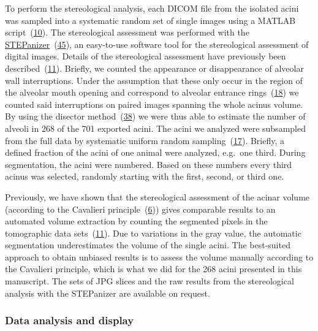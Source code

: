 \documentclass[
  american,
]{article}
\begin{document}
To perform the stereological analysis, each DICOM file from the isolated acini was sampled into a systematic random set of single images using a MATLAB script~(\protect\hyperlink{ref-12Z2YPzm8}{10}).
The stereological assessment was performed with the \href{http://stepanizer.com/}{STEPanizer}~(\protect\hyperlink{ref-nPoQ2EIB}{45}), an easy-to-use software tool for the stereological assessment of digital images.
Details of the stereological assessment have previously been described~(\protect\hyperlink{ref-7YLeeyu}{11}).
Briefly, we counted the appearance or disappearance of alveolar wall interruptions.
Under the assumption that these only occur in the region of the alveolar mouth opening and correspond to alveolar entrance rings~(\protect\hyperlink{ref-QiAxY2i3}{18}) we counted said interruptions on paired images spanning the whole acinus volume.
By using the disector method~(\protect\hyperlink{ref-FJ9FoB4m}{38}) we were thus able to estimate the number of alveoli in 268 of the 701 exported acini.
The acini we analyzed were subsampled from the full data by systematic uniform random sampling~(\protect\hyperlink{ref-dNc8FfNn}{17}).
Briefly, a defined fraction of the acini of one animal were analyzed, e.g.~one third.
During segmentation, the acini were numbered.
Based on these numbers every third acinus was selected, randomly starting with the first, second, or third one.

Previously, we have shown that the stereological assessment of the acinar volume (according to the Cavalieri principle~(\protect\hyperlink{ref-FE9HLB4f}{6})) gives comparable results to an automated volume extraction by counting the segmented pixels in the tomographic data sets~(\protect\hyperlink{ref-7YLeeyu}{11}).
Due to variations in the gray value, the automatic segmentation underestimates the volume of the single acini.
The best-suited approach to obtain unbiased results is to assess the volume manually according to the Cavalieri principle, which is what we did for the 268 acini presented in this manuscript.
The sets of JPG slices and the raw results from the stereological analysis with the STEPanizer are available on request.

\hypertarget{data-analysis-and-display}{%
\subsubsection{Data analysis and display}\label{data-analysis-and-display}}
\end{document}
